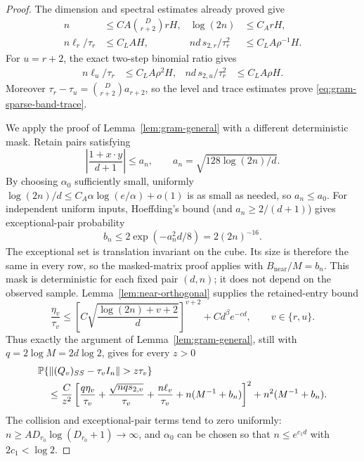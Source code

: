 \begin{proof}
The dimension and spectral estimates already proved give
\begin{align*}
 n&\le C A\binom D{r+2}rH,&
 \log(2n)&\le C_A rH,\\
 n\ell_r/\tau_r&\le C_LAH,&
 nd\,s_{2,r}/\tau_r^2&\le C_LA\rho^{-1}H.
\end{align*}
For $u=r+2$, the exact two-step binomial ratio gives
\begin{align*}
 n\ell_u/\tau_r&\le C_LA\rho^2H,&
 nd\,s_{2,u}/\tau_r^2&\le C_LA\rho H.
\end{align*}
Moreover $\tau_r-\tau_u=\binom D{r+2}a_{r+2}$, so the level and
trace estimates prove \eqref{eq:gram-sparse-band-trace}.

We apply the proof of Lemma~\ref{lem:gram-general} with a different
deterministic mask. Retain pairs satisfying
\[
 \left|\frac{1+x\cdot y}{d+1}\right|\le a_n,
 \qquad a_n=\sqrt{128\log(2n)/d}.
\]
By choosing $\alpha_0$ sufficiently small, uniformly
$\log(2n)/d\le C_A\alpha\log(e/\alpha)+o(1)$ is as small as needed,
so $a_n\le a_0$. For independent uniform inputs, Hoeffding's bound
(and $a_n\ge2/(d+1)$) gives exceptional-pair probability
\[
 b_n\le2\exp(-a_n^2d/8)=2(2n)^{-16}.
\]
The exceptional set is translation invariant on the cube. Its size
is therefore the same in every row, so the masked-matrix proof applies
with $B_{\mathrm{near}}/M=b_n$. This mask is deterministic for each
fixed pair $(d,n)$; it does not depend on the observed sample.
Lemma~\ref{lem:near-orthogonal} supplies the retained-entry bound
\begin{equation}\label{eq:sparse-coherence}
 \frac{\eta_v}{\tau_v}
 \le\left[C\sqrt{\frac{\log(2n)+v+2}{d}}\right]^{v+2}
       +C d^\beta e^{-cd},\qquad v\in\{r,u\}.
\end{equation}
Thus exactly the argument of Lemma~\ref{lem:gram-general}, still with
$q=2\log M=2d\log2$, gives for every $z>0$
\begin{align}
 &\mathbb P\{\|(Q_v)_{SS}-\tau_vI_n\|>z\tau_v\}\notag\\
 &\quad\le\frac C{z^2}
 \left[\frac{q\eta_v}{\tau_v}
       +\frac{\sqrt{nq s_{2,v}}}{\tau_v}
       +\frac{n\ell_v}{\tau_v}+n(M^{-1}+b_n)\right]^2
       +n^2(M^{-1}+b_n).
 \label{eq:sparse-masked-tropp}
\end{align}
The collision and exceptional-pair terms tend to zero uniformly:
$n\ge A D_{r_0}\log(D_{r_0}+1)\to\infty$, and $\alpha_0$ can be chosen
so that $n\le e^{c_1d}$ with $2c_1<\log2$.


\end{proof}
